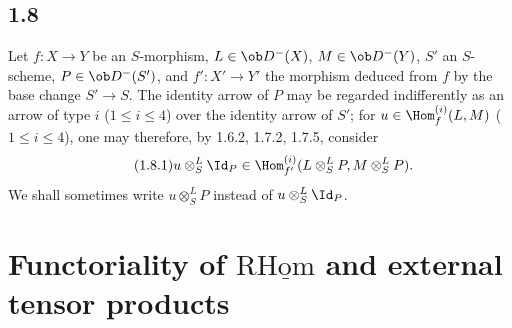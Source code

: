 \subsection*{1.8}
Let $f:X\to Y$ be an $S$-morphism, $L\in\ob D^{-}(X)$, $M\in\ob D^{-}(Y)$, $S'$ an $S$-scheme, $P\in\ob D^{-}(S')$, and $f':X'\to Y'$ the morphism deduced from $f$ by the base change $S'\to S$. The identity arrow of $P$ may be regarded indifferently as an arrow of type $i$ ($1\leq i\leq4$) over the identity arrow of $S'$; for $u\in\Hom_f^{(i)}(L,M)$ ($1\leq i\leq4$), one may therefore, by 1.6.2, 1.7.2, 1.7.5, consider
\begin{equation}\tag{1.8.1}
u\otimes^L_S\Id_P\in\Hom_{f'}^{(i)}(L\otimes^L_SP,M\otimes^L_SP).
\end{equation}
We shall sometimes write $u\otimes^L_SP$ instead of $u\otimes^L_S\Id_P$.

\section{Functoriality of \texorpdfstring{$\mathrm{R}\underline{\mathrm{Hom}}$}{RHom} and external tensor products}

